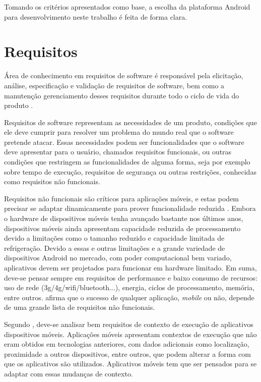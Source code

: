 Tomando os critérios apresentados como base, a escolha da plataforma Android para desenvolvimento neste trabalho é feita de forma clara.

\section{Requisitos}

Área de conhecimento em requisitos de software é responsável pela elicitação, análise, especificação e validação de requisitos de software, bem como a manutenção gerenciamento desses requisitos durante todo o ciclo de vida do produto \cite{swebok}.

Requisitos de software representam as necessidades de um produto, condições que ele deve cumprir para resolver um problema do mundo real que o software pretende atacar. Essas necessidades podem ser funcionalidades que o software deve apresentar para o usuário, chamados requisitos funcionais, ou outras condições que restringem as funcionalidades de alguma forma, seja por exemplo sobre tempo de execução, requisitos de segurança ou outras restrições, conhecidas como requisitos não funcionais.

Requisitos não funcionais são críticos para aplicações móveis, e estas podem precisar se adaptar dinamicamente para prover funcionalidade reduzida \cite{eswmobile}. Embora o hardware de dispositivos móveis tenha avançado bastante nos últimos anos, dispositivos móveis ainda apresentam capacidade reduzida de processamento devido a limitações como o tamanho reduzido e capacidade limitada de refrigeração. Devido a essas e outras limitações e a grande variedade de dispositivos Android no mercado, com poder computacional bem variado, aplicativos devem ser projetados para funcionar em hardware limitado. Em suma, deve-se pensar sempre em requisitos de performance e baixo consumo de recursos: uso de rede (3g/4g/wifi/bluetooth...), energia, ciclos de processamento, memória, entre outros.  afirma que o sucesso de qualquer aplicação, \textit{mobile} ou não, depende de uma grande lista de requisitos não funcionais.  

Segundo , deve-se analisar bem requisitos de contexto de execução de aplicativos dispositivos móveis. Aplicações móveis apresentam contextos de execução que não eram obtidos em tecnologias anteriores, com dados adicionais como localização, proximidade a outros dispositivos, entre outros, que podem alterar a forma com que os aplicativos são utilizados. Aplicativos móveis tem que ser pensados para se adaptar com essas mudanças de contexto.

